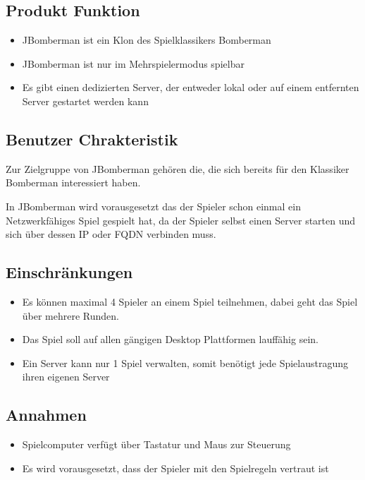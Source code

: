 \documentclass[11pt]{scrartcl}
\begin{document}
\subsection{Produkt Funktion}
\label{sec:Produkt Funktion}
\begin{itemize}
    \item JBomberman ist ein Klon des Spielklassikers Bomberman
    \item JBomberman ist nur im Mehrspielermodus spielbar
    \item Es gibt einen dedizierten Server, der entweder lokal oder 
    auf einem entfernten Server gestartet werden kann
\end{itemize}

\subsection{Benutzer Chrakteristik}
\label{sec:Benutzer Chrakteristik}
Zur Zielgruppe von JBomberman gehören die, die  sich 
bereits für den Klassiker Bomberman interessiert haben.

In JBomberman wird vorausgesetzt das der Spieler schon einmal 
ein Netzwerkfähiges Spiel gespielt hat, da der Spieler selbst einen 
Server starten und sich über dessen IP oder FQDN verbinden muss.
\subsection{Einschränkungen}
\label{sec:Einschränkungen}
\begin{itemize}
    \item Es können maximal 4 Spieler an einem Spiel teilnehmen, 
    dabei geht das Spiel über mehrere Runden.
    \item Das Spiel soll auf allen gängigen Desktop Plattformen lauffähig sein.
    \item Ein Server kann nur 1 Spiel verwalten, somit benötigt
     jede Spielaustragung ihren eigenen Server
\end{itemize}
\subsection{Annahmen}
\label{sec:Annahmen}
\begin{itemize}
    \item Spielcomputer verfügt über Tastatur und Maus zur Steuerung
    \item Es wird vorausgesetzt, dass der Spieler mit den Spielregeln vertraut ist
\end{itemize}
\end{document}

